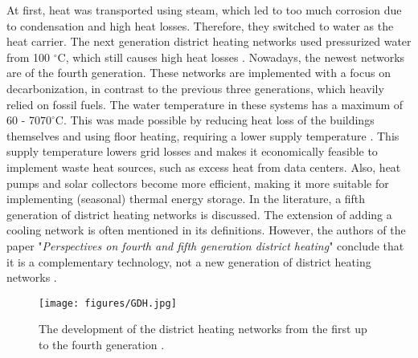 At first, heat was transported using steam, which led to too much corrosion due to condensation and high heat losses. Therefore, they switched to water as the heat carrier. The next generation district heating networks used pressurized water from 100 $^{\circ}\text{C}$, which still causes high heat losses \cite{FemkeJanssenLit}. Nowadays, the newest networks are of the fourth generation. These networks are implemented with a focus on decarbonization, in contrast to the previous three generations, which heavily relied on fossil fuels. The water temperature in these systems has a maximum of 60 - 70$70^{\circ}\text{C}$. This was made possible by reducing heat loss of the buildings themselves and using floor heating, requiring a lower supply temperature \cite{FemkeJanssenLit}. This supply temperature lowers grid losses and makes it economically feasible to implement waste heat sources, such as excess heat from data centers. Also, heat pumps and solar collectors become more efficient, making it more suitable for implementing (seasonal) thermal energy storage. In the literature, a fifth generation of district heating networks is discussed. The extension of adding a cooling network is often mentioned in its definitions. However, the authors of the paper "\textit{Perspectives on fourth and fifth generation district heating}" conclude that it is a complementary technology, not a new generation of district heating networks \cite{4GDH5GDH}. 

\begin{figure}[h]
    \centering
    \texttt{[image: figures/GDH.jpg]}
    \caption{The development of the district heating networks from the first up to the fourth generation \cite{4GDH5GDH}.}
    \label{fig:devDHN}
\end{figure}

